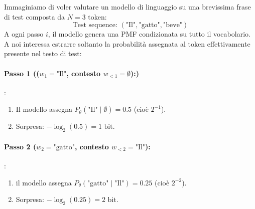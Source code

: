 \begin{example}{}
    Immaginiamo di voler valutare un modello di linguaggio su una brevissima frase di test composta da $N = 3$ token:   $$\text{Test sequence: } (\text{"Il"}, \text{"gatto"}, \text{"beve"})$$
    A ogni passo $i$, il modello genera una PMF condizionata su tutto il vocabolario. A noi interessa estrarre soltanto la probabilità assegnata al token effettivamente presente nel testo di test: 
    \paragraph{Passo 1 (($w_1 = \text{"Il"}$, contesto $w_{<1} = \emptyset$):)} :
    \begin{enumerate}
        \item Il modello assegna $P_\theta(\text{"Il"} \mid \emptyset) = 0.5$ (cioè $2^{-1}$).
        \item Sorpresa: $-\log_2(0.5) = 1 \text{ bit}$.
    \end{enumerate} 
    \paragraph{Passo 2 ($w_2 = \text{"gatto"}$, contesto $w_{<2} = \text{"Il"}$):} :
    \begin{enumerate}
        \item il modello assegna $P_\theta(\text{"gatto"} \mid \text{"Il"}) = 0.25$ (cioè $2^{-2}$).
        \item Sorpresa: $-\log_2(0.25) = 2 \text{ bit}$.
    \end{enumerate} 

\end{example}
